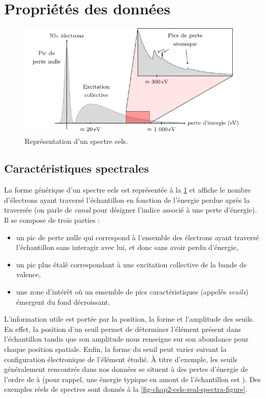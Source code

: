     \section{Propriétés des données }\label{sec-prop-eels}

    \begin{figure}[t]
        \centering
        \includegraphics[]{img/chapitre1/figure5/eels-spectrum-shape.pdf}
        \caption{Représentation d'un spectre \gls{eels}.
            \protect\label{fig-chap2-eels-spectrum-shape}}
    \end{figure}

    \subsection{Caractéristiques spectrales} La forme générique d'un spectre \gls{eels} est représentée à la \cref{fig-chap2-eels-spectrum-shape} et affiche le nombre d'électrons ayant traversé l'échantillon en fonction de l'énergie perdue après la traversée (on parle de \emph{canal} pour désigner l'indice associé à une perte d'énergie). Il se compose de trois parties :
    \begin{itemize}
    	\item un pic de perte nulle qui correspond à l'ensemble des électrons ayant traversé l'échantillon sans interagir avec lui, et donc sans avoir perdu d'énergie,
    	\item un pic plus étalé correspondant à une excitation collective de la bande de valence,
    	\item une zone d'intérêt où un ensemble de pics caractéristiques (appelés \emph{seuils}) émergent du fond décroissant.
    \end{itemize}
    L'information utile est portée par la position, la forme et l'amplitude des seuils. En effet, la position d'un seuil permet de déterminer l'élément présent dans l'échantillon tandis que son amplitude nous renseigne sur son abondance pour chaque position spatiale. Enfin, la forme du seuil peut varier suivant la configuration électronique de l'élément étudié.
    \`A titre d'exemple, les seuils généralement rencontrés dans nos données se situent à des pertes d'énergie de l'ordre de  à  (pour rappel, une énergie typique en amont de l'échantillon est ).
    Des exemples réels de spectres sont donnés à la \cref{fig-chap2-eels-real-spectra-figure}.


